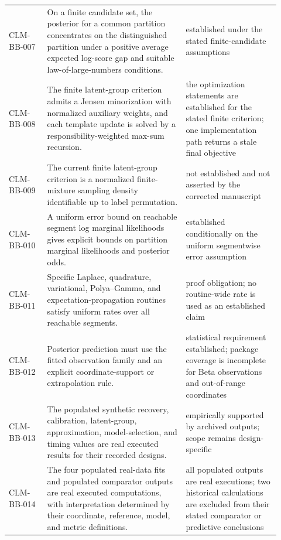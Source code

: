 \begin{longtable}{@{}p{0.13\linewidth}p{0.47\linewidth}p{0.32\linewidth}@{}}
CLM-BB-007 & On a finite candidate set, the posterior for a common partition concentrates on the distinguished partition under a positive average expected log-score gap and suitable law-of-large-numbers conditions. & established under the stated finite-candidate assumptions \\
CLM-BB-008 & The finite latent-group criterion admits a Jensen minorization with normalized auxiliary weights, and each template update is solved by a responsibility-weighted max-sum recursion. & the optimization statements are established for the stated finite criterion; one implementation path returns a stale final objective \\
CLM-BB-009 & The current finite latent-group criterion is a normalized finite-mixture sampling density identifiable up to label permutation. & not established and not asserted by the corrected manuscript \\
CLM-BB-010 & A uniform error bound on reachable segment log marginal likelihoods gives explicit bounds on partition marginal likelihoods and posterior odds. & established conditionally on the uniform segmentwise error assumption \\
CLM-BB-011 & Specific Laplace, quadrature, variational, Polya--Gamma, and expectation-propagation routines satisfy uniform rates over all reachable segments. & proof obligation; no routine-wide rate is used as an established claim \\
CLM-BB-012 & Posterior prediction must use the fitted observation family and an explicit coordinate-support or extrapolation rule. & statistical requirement established; package coverage is incomplete for Beta observations and out-of-range coordinates \\
CLM-BB-013 & The populated synthetic recovery, calibration, latent-group, approximation, model-selection, and timing values are real executed results for their recorded designs. & empirically supported by archived outputs; scope remains design-specific \\
CLM-BB-014 & The four populated real-data fits and populated comparator outputs are real executed computations, with interpretation determined by their coordinate, reference, model, and metric definitions. & all populated outputs are real executions; two historical calculations are excluded from their stated comparator or predictive conclusions \\
\bottomrule
\end{longtable}
\normalsize

